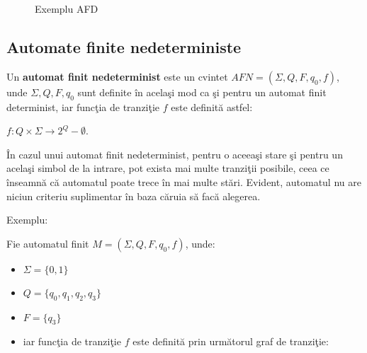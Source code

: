 \begin{figure}[H]
\centering
{}
\caption{Exemplu AFD}
\end{figure}

\subsection{Automate finite nedeterministe}

\begin{definitie}
Un \textbf{automat finit nedeterminist} este un cvintet $AFN=(\Sigma, Q, F, q_{0}, f)$, unde $\Sigma, Q, F, q_{0}$ sunt definite în acelaşi mod ca şi pentru un automat finit determinist, iar funcţia de tranziţie $f$ este definită astfel:

$f:Q \times \Sigma \rightarrow 2^{Q} - \emptyset$.
\end{definitie}

În cazul unui automat finit nedeterminist, pentru o aceeaşi stare şi pentru un acelaşi simbol de la intrare, pot exista mai multe tranziţii posibile, ceea ce înseamnă că automatul poate trece în mai multe stări. Evident, automatul nu are niciun criteriu suplimentar în baza căruia să facă alegerea.

Exemplu:

Fie automatul finit $M=(\Sigma, Q, F, q_{0}, f)$, unde:
\begin{itemize}
\item
$\Sigma=\{ 0, 1 \}$
\item
$Q=\{ q_{0}, q_{1}, q_{2}, q_{3} \}$
\item
$F=\{ q_{3} \}$
\item
iar funcţia de tranziţie $f$ este definită prin următorul graf de tranziţie:
\end{itemize}

